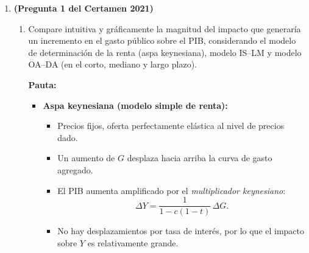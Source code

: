 \documentclass[11pt,addpoints]{article}
\begin{document}
\begin{enumerate}
Para la tasa de interés:
\[
\Delta_i(t) =
\begin{vmatrix}
1 - c(1-t) & \bar{A} \\
-k & -\dfrac{\bar{M}}{\bar{P}}
\end{vmatrix}
= -\big[1 - c(1-t)\big]\frac{\bar{M}}{\bar{P}} + k\bar{A},
\]
\[
i^*(t) = \frac{\Delta_i(t)}{\Delta(t)}.
\]

El término $1 - c(1-t)$ aumenta con $t$, por lo que, bajo supuestos estándar de parámetros positivos, el aumento de $t$ desplaza IS hacia la izquierda y reduce tanto $Y$ como $i$:
\[
\frac{\partial i^*}{\partial t} < 0.
\]

\textbf{Conclusión:} al aumentar la tasa impositiva $t$, el sistema IS–LM con variables autónomas $\bar{C},\bar{I},\bar{G},\overline{XN}$ y $\bar{M}/\bar{P}$ presenta un menor nivel de producción de equilibrio $Y^*$ y una menor tasa de interés de equilibrio $i^*$, lo que se ve claramente al escribir el sistema en forma matricial y usar la regla de Cramer.

\vspace{0.4cm}

\item \textbf{(Pregunta 1 del Certamen 2021)}

\begin{enumerate}[label=\alph*)]
\item Compare intuitiva y gráficamente la magnitud del impacto que generaría un incremento en el gasto público sobre el PIB, considerando el modelo de determinación de la renta (aspa keynesiana), modelo IS–LM y modelo OA–DA (en el corto, mediano y largo plazo).

\textbf{Pauta:}

\begin{itemize}
\item \textbf{Aspa keynesiana (modelo simple de renta):}
  \begin{itemize}
    \item Precios fijos, oferta perfectamente elástica al nivel de precios dado.
    \item Un aumento de $G$ desplaza hacia arriba la curva de gasto agregado.
    \item El PIB aumenta amplificado por el \emph{multiplicador keynesiano}:
    \[
    \Delta Y = \frac{1}{1 - c(1-t)}\,\Delta G.
    \]
    \item No hay desplazamientos por tasa de interés, por lo que el impacto sobre $Y$ es relativamente grande.
  \end{itemize}


\end{itemize}
\end{enumerate}
\end{enumerate}
\end{document}
